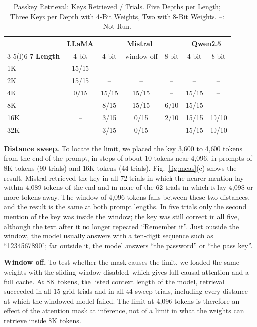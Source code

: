 \documentclass[conference]{IEEEtran}
\begin{document}
\begin{table}[!t]
\caption{Passkey Retrieval: Keys Retrieved / Trials. Five Depths per Length; Three Keys per Depth with 4-Bit Weights, Two with 8-Bit Weights. --: Not Run.}
\label{tab:passkey}
\centering
\footnotesize
\setlength{\tabcolsep}{3.5pt}
\begin{tabular}{@{}lcccccc@{}}
\toprule
 & \textbf{LLaMA} & \multicolumn{3}{c}{\textbf{Mistral}} & \multicolumn{2}{c}{\textbf{Qwen2.5}} \\
\cmidrule(lr){3-5}\cmidrule(l){6-7}
\textbf{Length} & 4-bit & 4-bit & window off & 8-bit & 4-bit & 8-bit \\
\midrule
1K & 15/15 & -- & -- & -- & -- & -- \\
2K & 15/15 & -- & -- & -- & -- & -- \\
4K & 0/15 & 15/15 & 15/15 & -- & 15/15 & -- \\
8K & -- & 8/15 & 15/15 & 6/10 & 15/15 & -- \\
16K & -- & 3/15 & 0/15 & 2/10 & 15/15 & 10/10 \\
32K & -- & 3/15 & 0/15 & -- & 15/15 & 10/10 \\
\bottomrule
\end{tabular}
\end{table}

\textbf{Distance sweep.} To locate the limit, we placed the key 3,600 to 4,600 tokens from the end of the prompt, in steps of about 10 tokens near 4,096, in prompts of 8K tokens (90 trials) and 16K tokens (44 trials). Fig.~\ref{fig:meas}(c) shows the result. Mistral retrieved the key in all 72 trials in which the nearer mention lay within 4,089 tokens of the end and in none of the 62 trials in which it lay 4,098 or more tokens away. The window of 4,096 tokens falls between these two distances, and the result is the same at both prompt lengths. In five trials only the second mention of the key was inside the window; the key was still correct in all five, although the text after it no longer repeated ``Remember it''. Just outside the window, the model usually answers with a ten-digit sequence such as ``1234567890''; far  outside it, the model answers ``the password'' or ``the pass key''.

\textbf{Window off.} To test whether the mask causes the limit, we loaded the same weights with the sliding window disabled, which gives full causal attention and a full cache. At 8K tokens, the listed context length of the model, retrieval succeeded in all 15 grid trials and in all 44 sweep trials, including every distance at which the windowed model failed. The limit at 4,096 tokens is therefore an effect of the attention mask at inference, not of a limit in what the weights can retrieve inside 8K tokens.
\end{document}
